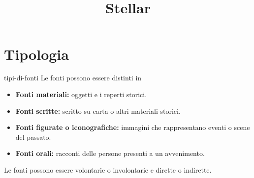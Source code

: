 \documentclass[preview]{standalone}
\begin{document}
\title{Stellar}
\genpage

\section{Tipologia }

\begin{snippet}{tipi-di-fonti}
    Le fonti possono essere distinti in
    \begin{itemize}
        \item \textbf{Fonti materiali:} oggetti e i reperti storici.
        \item \textbf{Fonti scritte:} scritto su carta o altri materiali storici.
        \item \textbf{Fonti figurate o iconografiche:} immagini che rappresentano eventi o scene del passato.
        \item \textbf{Fonti orali:} racconti delle persone presenti a un avvenimento.
    \end{itemize}

    Le fonti possono essere volontarie o involontarie e
    dirette o indirette.
\end{snippet}
\end{document}
